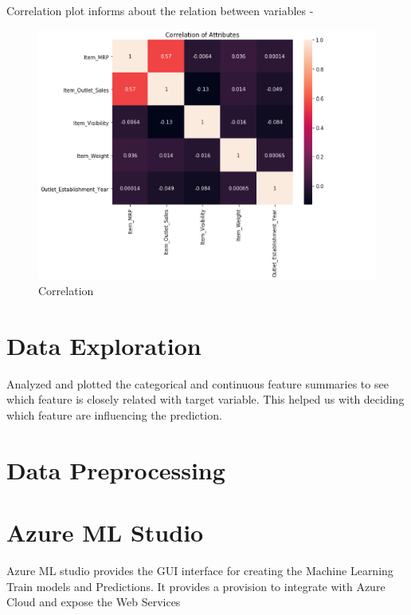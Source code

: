 Correlation plot informs about the relation between variables -
\begin{figure}[pic2]
	\centering\includegraphics[width=\columnwidth]{Images/mlstudio/Correlation.png}
	\caption{Correlation}\label{fig:Correlation}
\end{figure}

\section{Data Exploration}
Analyzed and plotted the categorical and continuous feature summaries to 
see which feature is 
closely related with target variable. This helped us with deciding which 
feature are influencing 
the prediction.

\section{Data Preprocessing}


\section{Azure ML Studio}
Azure ML studio provides the GUI interface for creating the Machine 
Learning Train models and Predictions. It provides a provision to integrate 
with Azure Cloud and expose the Web Services

